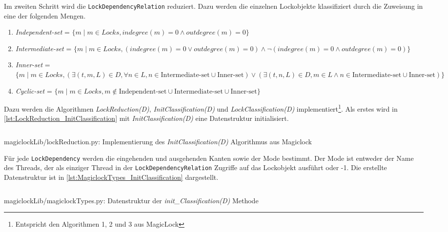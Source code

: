 Im zweiten Schritt wird die \texttt{Lock\-Dependency\-Relation} reduziert. Dazu
werden die einzelnen Lockobjekte klassifiziert durch die Zuweisung in eine der
folgenden Mengen.\autocite[vgl.][4]{MagicLock}
\begin{enumerate}
  \item \emph{Independent-set} = $\{m \mid m \in Locks, indegree(m) = 0 \land
  outdegree(m) = 0\}$
  \item \emph{Intermediate-set} = $\{m \mid m \in Locks, (indegree(m) = 0 \lor
  outdegree(m) = 0) \land \lnot (indegree(m) = 0 \land outdegree(m) = 0)\}$
  \item \emph{Inner-set} = $\{m \mid m \in Locks, (\exists (t,m,L) \in D,
  \forall n \in L, n \in \text{Intermediate-set} \cup \text{Inner-set}) \lor
  (\exists (t,n,L) \in D, m \in L \land n \in \text{Intermediate-set} \cup
  \text{Inner-set})\}$
  \item \emph{Cyclic-set} = $\{m \mid m \in Locks, m \notin
  \text{Independent-set} \cup \text{Intermediate-set} \cup \text{Inner-set}\}$
\end{enumerate}
Dazu werden die Algorithmen \emph{LockReduction(D)},
\emph{InitClassification(D)} und \emph{LockClassification(D)}
implementiert\footnote{Entspricht den Algorithmen 1, 2 und 3 aus
MagicLock\autocite[5]{MagicLock}}. Als erstes wird in
\cref{lst:LockReduction_InitClassification} mit \emph{InitClassification(D)}
eine Datenstruktur initialisiert.
\begin{listing}[ht]
  \inputminted[frame=lines,linenos,firstline=17,lastline=32]{python}{./Python/magiclockLib/lockReduction.py}
  \caption{magiclockLib/lockReduction.py: Implementierung des \emph{InitClassification(D)} Algorithmus aus Magiclock\autocite[5]{MagicLock}}
  \label{lst:LockReduction_InitClassification}
\end{listing}
Für jede \texttt{Lock\-Dependency} werden die eingehenden und ausgehenden Kanten
sowie der Mode bestimmt. Der Mode ist entweder der Name des Threads, der als
einziger Thread in der \texttt{Lock\-Dependency\-Relation} Zugriffe auf das
Lockobjekt ausführt oder -1. Die erstellte Datenstruktur ist in
\cref{lst:MagiclockTypes_InitClassification} dargestellt.
\begin{listing}[ht]
  \inputminted[frame=lines,linenos,firstline=3,lastline=8]{python}{./Python/magiclockLib/magiclockTypes.py}
  \caption{magiclockLib/magiclockTypes.py: Datenstruktur der \emph{init\_Classification(D)} Methode}
  \label{lst:MagiclockTypes_InitClassification}
\end{listing}
